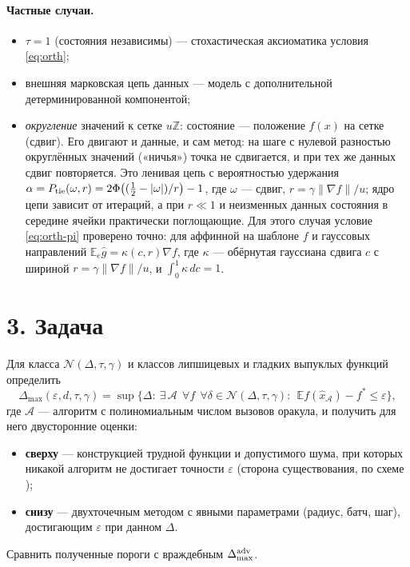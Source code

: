 \documentclass[10pt,a4paper]{article}
\newcommand{\E}{\mathbb E}\newcommand{\R}{\mathbb R}
\newcommand{\norm}[1]{\lVert #1\rVert}\newcommand{\abs}[1]{\lvert #1\rvert}
\newcommand{\Dmax}{\Delta_{\max}}
\theoremstyle{definition}\newtheorem{definition}{Определение}
\begin{document}
\paragraph{Частные случаи.}
\begin{itemize}
\item $\tau=1$ (состояния независимы) — стохастическая аксиоматика условия \eqref{eq:orth};
\item внешняя марковская цепь данных — модель \cite{prokhorov} с дополнительной детерминированной компонентой;
\item \emph{округление} значений к сетке $u\mathbb Z$: состояние — положение $f(x)$ на сетке (сдвиг). Его двигают и данные, и сам метод: на шаге с нулевой разностью округлённых значений («ничья») точка не сдвигается, и при тех же данных сдвиг повторяется. Это ленивая цепь с вероятностью удержания $\alpha=P_{\rm tie}(\omega,r)=2\Phi\big((\tfrac12-\abs\omega)/r\big)-1$, где $\omega$ — сдвиг, $r=\gamma\norm{\nabla f}/u$; ядро цепи зависит от итераций, а при $r\ll1$ и неизменных данных состояния в середине ячейки практически поглощающие. Для этого случая условие \eqref{eq:orth-pi} проверено точно: для аффинной на шаблоне $f$ и гауссовых направлений $\E_e\hat g=\kappa(c,r)\nabla f$, где $\kappa$ — обёрнутая гауссиана сдвига $c$ с шириной $r=\gamma\norm{\nabla f}/u$, и $\int_0^1\kappa\,dc=1$.
\end{itemize}

\section*{3. Задача}
\begin{tcolorbox}[box,title={Цель}]
Для класса $\mathcal N(\Delta,\tau,\gamma)$ и классов липшицевых и гладких выпуклых функций определить
\[
\Dmax(\varepsilon,d,\tau,\gamma)=\sup\big\{\Delta:\ \exists\,\mathcal A\ \ \forall f\ \ \forall\delta\in\mathcal N(\Delta,\tau,\gamma):\ \ \E f(\hat x_{\mathcal A})-f^*\le\varepsilon\big\},
\]
где $\mathcal A$ — алгоритм с полиномиальным числом вызовов оракула,
и получить для него двусторонние оценки:
\begin{itemize}
\item \textbf{сверху} — конструкцией трудной функции и допустимого шума, при которых никакой алгоритм не достигает точности $\varepsilon$ (сторона существования, по схеме \cite{pasechnyuk});
\item \textbf{снизу} — двухточечным методом с явными параметрами (радиус, батч, шаг), достигающим $\varepsilon$ при данном $\Delta$.
\end{itemize}
Сравнить полученные пороги с враждебным $\Dmax^{\rm adv}$.
\end{tcolorbox}
\end{document}

